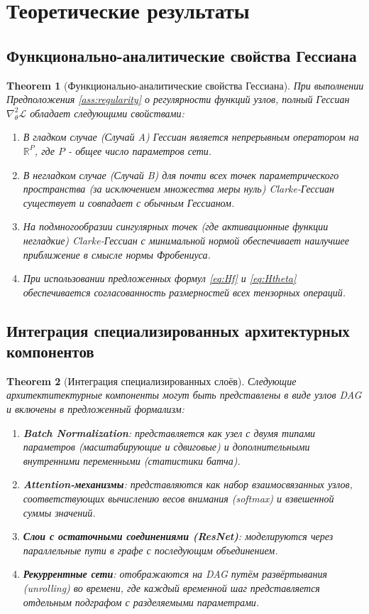 \documentclass[11pt]{article}
\newtheorem{theorem}{Theorem}
\begin{document}
\section{Теоретические результаты}

\subsection{Функционально-аналитические свойства Гессиана}

\begin{theorem}[Функционально-аналитические свойства Гессиана]
  При выполнении Предположения \ref{ass:regularity} о регулярности функций узлов, полный Гессиан
  $\nabla^2_\theta \mathcal{L}$ обладает следующими свойствами:
  \begin{enumerate}
    \item В гладком случае (Случай A) Гессиан является непрерывным оператором на $\mathbb{R}^P$, где $P$ -
      общее число параметров сети.
    \item В негладком случае (Случай B) для почти всех точек параметрического пространства (за исключением
      множества меры нуль) Clarke-Гессиан существует и совпадает с обычным Гессианом.
    \item На подмногообразии сингулярных точек (где активационные функции негладкие) Clarke-Гессиан с
      минимальной нормой обеспечивает наилучшее приближение в смысле нормы Фробениуса.
    \item При использовании предложенных формул \eqref{eq:Hf} и \eqref{eq:Htheta} обеспечивается
      согласованность размерностей всех тензорных операций.
  \end{enumerate}
\end{theorem}

\subsection{Интеграция специализированных архитектурных компонентов}

\begin{theorem}[Интеграция специализированных слоёв]
  Следующие архитектитектурные компоненты могут быть представлены в виде узлов DAG и включены в предложенный формализм:
  \begin{enumerate}
    \item \textbf{Batch Normalization}: представляется как узел с двумя типами параметров (масштабирующие и
      сдвиговые) и дополнительными внутренними переменными (статистики батча).
    \item \textbf{Attention-механизмы}: представляются как набор взаимосвязанных узлов, соответствующих
      вычислению весов внимания (softmax) и взвешенной суммы значений.
    \item \textbf{Слои с остаточными соединениями (ResNet)}: моделируются через параллельные пути в графе с
      последующим объединением.
    \item \textbf{Рекуррентные сети}: отображаются на DAG путём развёртывания (unrolling) во времени, где
      каждый временной шаг представляется отдельным подграфом с разделяемыми параметрами.
  \end{enumerate}
\end{theorem}
\end{document}
